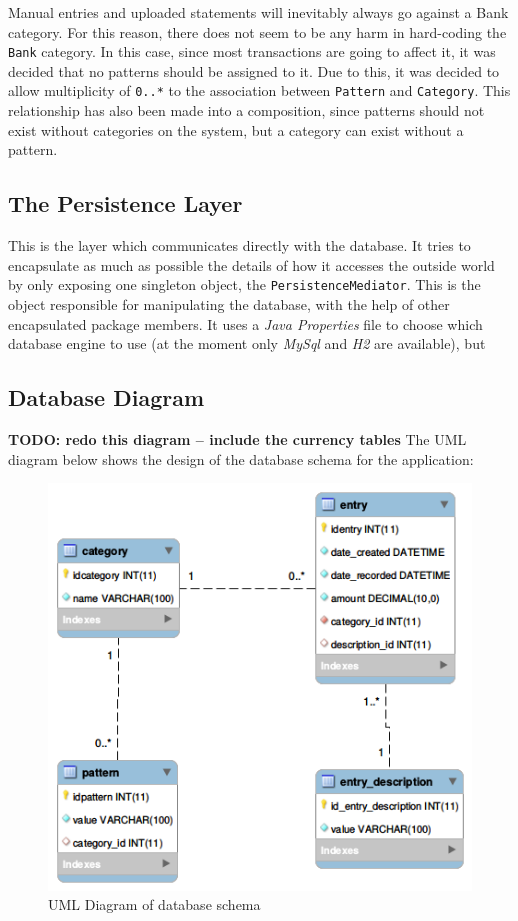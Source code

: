 Manual entries and uploaded statements will inevitably always go against a Bank
category. For this reason, there does not seem to be any harm in hard-coding
the \texttt{Bank} category. In this case, since most transactions are going to
affect it, it was decided that no patterns should be assigned to it. Due to
this, it was decided to allow multiplicity of \texttt{0..*} to the association
between \texttt{Pattern} and \texttt{Category}. This relationship has also been
made into a composition, since patterns should not exist without categories on
the system, but a category can exist without a pattern.


\subsection{The Persistence Layer} \label{sec:AnalysisAndDesign.PersistenceLayer}
This is the layer which communicates directly with the database. It tries to
encapsulate as much as possible the details of how it accesses the outside
world by only exposing one singleton object, the \texttt{PersistenceMediator}.
This is the object responsible for manipulating the database, with the help of
other encapsulated package members. It uses a \emph{Java Properties} file to
choose which database engine to use (at the moment only \emph{MySql} and
\emph{H2} are available), but 

\subsection{Database Diagram} \label{sec:AnalysisAndDesign.PersistenceLayer}
\textbf{TODO: redo this diagram -- include the currency tables}
The UML diagram below shows the design of the database schema for the
application:
\begin{figure}[ht!]
  \begin{center}
    \includegraphics[width=12cm]{./contents/img/Database_Diagram.png}
  \end{center}
  \caption{UML Diagram of database schema}
  \label{fig:ClassDiagram.AllClasses}
\end{figure}
\FloatBarrier

